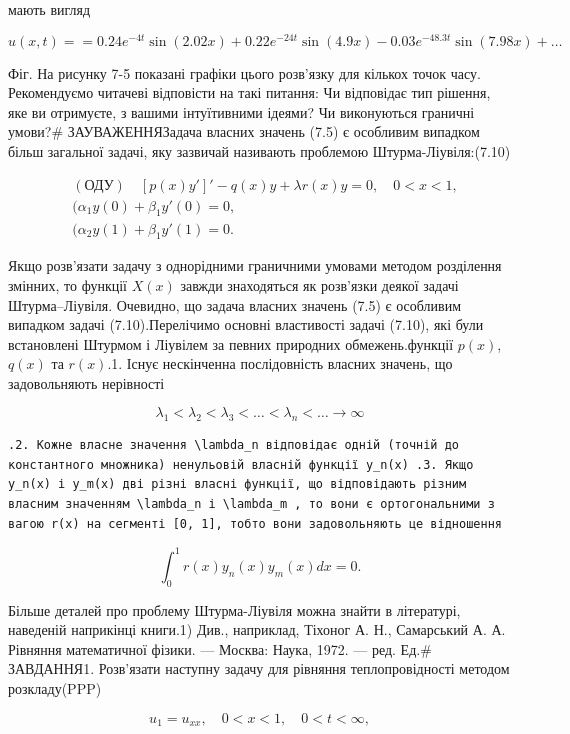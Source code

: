 \documentclass[
  ukrainian,
]{article}
\begin{document}
мають вигляд

\[
u(x, t) = = 0.24e^{-4t} \sin(2.02x) + 0.22e^{-24t} \sin(4.9x) - 0.03e^{-48.3t} \sin(7.98x) + \dots
\]

Фіг. На рисунку 7-5 показані графіки цього розв'язку для кількох точок
часу. Рекомендуємо читачеві відповісти на такі питання: Чи відповідає
тип рішення, яке ви отримуєте, з вашими інтуїтивними ідеями? Чи
виконуються граничні умови?\# ЗАУВАЖЕННЯЗадача власних значень (7.5) є
особливим випадком більш загальної задачі, яку зазвичай називають
проблемою Штурма-Ліувіля:(7.10)

\[
\begin{aligned} & (\text{ОДУ}) \quad [p(x)y']' - q(x)y + \lambda r(x)y = 0, \quad 0 < x < 1, \\ & (\alpha_1 y(0) + \beta_1 y'(0) = 0, \\ & (\alpha_2 y(1) + \beta_1 y'(1) = 0. \end{aligned}
\]

Якщо розв'язати задачу з однорідними граничними умовами методом
розділення змінних, то функції \(X(x)\) завжди знаходяться як розв'язки
деякої задачі Штурма--Ліувіля. Очевидно, що задача власних значень (7.5)
є особливим випадком задачі (7.10).Перелічимо основні властивості задачі
(7.10), які були встановлені Штурмом і Ліувілем за певних природних
обмежень.функції \(p(x)\), \(q(x)\) та \(r(x)\).1. Існує нескінченна
послідовність власних значень, що задовольняють нерівності

\[
\lambda_1 < \lambda_2 < \lambda_3 < \ldots < \lambda_n < \ldots \to \infty
\]

\begin{verbatim}
.2. Кожне власне значення \lambda_n відповідає одній (точній до константного множника) ненульовій власній функції y_n(x) .3. Якщо y_n(x) і y_m(x) дві різні власні функції, що відповідають різним власним значенням \lambda_n і \lambda_m , то вони є ортогональними з вагою r(x) на сегменті [0, 1], тобто вони задовольняють це відношення
\end{verbatim}

\[
\int_{0}^{1} r(x) y_{n}(x) y_{m}(x) dx = 0.
\]

Більше деталей про проблему Штурма-Ліувіля можна знайти в літературі,
наведеній наприкінці книги.1) Див., наприклад, Тіхоног А. Н., Самарський
А. А. Рівняння математичної фізики. --- Москва: Наука, 1972. --- ред.
Ед.\# ЗАВДАННЯ1. Розв'язати наступну задачу для рівняння
теплопровідності методом розкладу(PPP)

\[
u_1 = u_{xx}, \quad 0 < x < 1, \quad 0 < t < \infty,
\]
\end{document}
